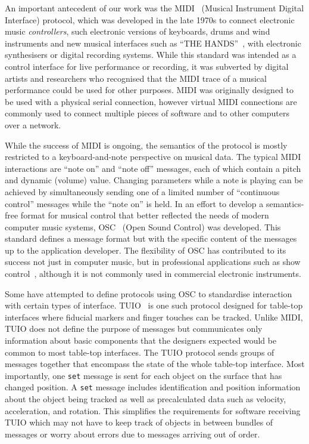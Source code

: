 \documentclass[graybox]{svmult}
\begin{document}

An important antecedent of our work was the
MIDI~\cite{midi1996complete} (Musical Instrument Digital Interface)
protocol, which was developed in the late 1970s to connect electronic
music \emph{controllers}, such electronic versions of keyboards, drums
and wind instruments and new musical interfaces such as ``THE
HANDS''~\cite{TheHandsArticle}, with electronic synthesisers or
digital recording systems. While this standard was intended as a
control interface for live performance or recording, it was subverted
by digital artists and researchers who recognised that the MIDI trace
of a musical performance could be used for other purposes. MIDI was
originally designed to be used with a physical serial connection,
however virtual MIDI connections are commonly used to connect multiple
pieces of software and to other computers over a
network\cite{Lazzaro:2004pb}.

While the success of MIDI is ongoing, the semantics of the protocol is
mostly restricted to a keyboard-and-note perspective on musical data.
The typical MIDI interactions are ``note on'' and ``note off''
messages, each of which contain a pitch and dynamic (volume) value.
Changing parameters while a note is playing can be achieved by
simultaneously sending one of a limited number of ``continuous
control'' messages while the ``note on'' is held. In an effort to
develop a semantics-free format for musical control that better
reflected the needs of modern computer music systems,
OSC~\cite{osc-nime2009} (Open Sound Control) was developed. This
standard defines a message format but with the specific content of the
messages up to the application developer. The flexibility of OSC has
contributed to its success not just in computer music, but in
professional applications such as show
control~\cite{schmeder2010best}, although it is not commonly used in
commercial electronic instruments.

Some have attempted to define protocols using OSC to standardise
interaction with certain types of interface. TUIO~\cite{TUIO_KBBC05}
is one such protocol designed for table-top interfaces where fiducial
markers and finger touches can be tracked. Unlike MIDI, TUIO does not
define the purpose of messages but communicates only information about
basic components that the designers expected would be common to most
table-top interfaces. The TUIO protocol sends groups of messages
together that encompass the state of the whole table-top interface.
Most importantly, one \texttt{set} message is sent for each object on
the surface that has changed position. A \texttt{set} message includes
identification and position information about the object being tracked
as well as precalculated data such as velocity, acceleration, and
rotation. This simplifies the requirements for software receiving TUIO
which may not have to keep track of objects in between bundles of
messages or worry about errors due to messages arriving out of order.
\end{document}

